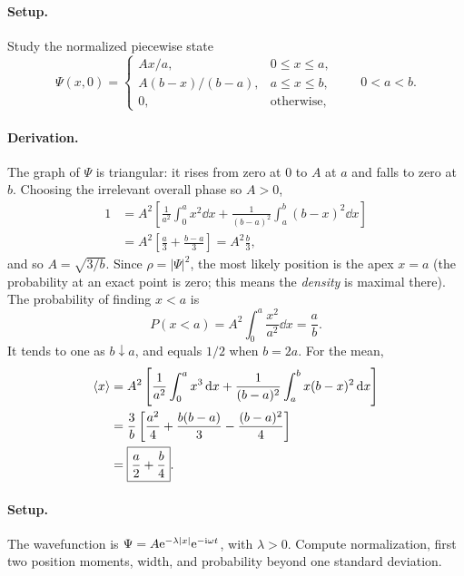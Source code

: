 \paragraph{Setup.} Study the normalized piecewise state
\begin{equation}
\Psi(x,0)=
\begin{cases}
Ax/a,&0\le x\le a,\\
A(b-x)/(b-a),&a\le x\le b,\\
0,&\text{otherwise},
\end{cases}
\qquad 0<a<b.
\end{equation}
\paragraph{Derivation.}
The graph of $\Psi$ is triangular: it rises from zero at $0$ to $A$ at $a$ and falls to zero at $b$. Choosing the irrelevant overall phase so $A>0$,
\begin{align}
1&=A^2\left[\frac1{a^2}\int_0^a x^2\dd x+
\frac1{(b-a)^2}\int_a^b(b-x)^2\dd x\right]\\
&=A^2\left[\frac a3+\frac{b-a}3\right]
=A^2\frac b3,
\end{align}
and so $\boxed{A=\sqrt{3/b}}$. Since $\rho=|\Psi|^2$, the most likely position is the apex $x=a$ (the probability at an exact point is zero; this means the \emph{density} is maximal there).
The probability of finding $x<a$ is
\begin{equation}
P(x<a)=A^2\int_0^a \frac{x^2}{a^2}\dd x
=\boxed{\frac ab}.
\end{equation}
It tends to one as $b\downarrow a$, and equals $1/2$ when $b=2a$. For the mean,
\begin{align}
\left\langle x\right\rangle&=A^2\left[\frac1{a^2}\int_0^a x^3\,\mathrm{d} x+
\frac1{(b-a)^2}\int_a^b x(b-x)^2\,\mathrm{d} x\right]\\
&=\frac3b\left[\frac{a^2}4+\frac{b(b-a)}3-\frac{(b-a)^2}4\right]\\
&=\boxed{\frac a2+\frac b4}.
\end{align}

\paragraph{Setup.} The wavefunction is $\Psi=A\mathrm{e}^{-\lambda|x|}\mathrm{e}^{-\mathrm{i}\omega t}$, with $\lambda>0$. Compute normalization, first two position moments, width, and probability beyond one standard deviation.
